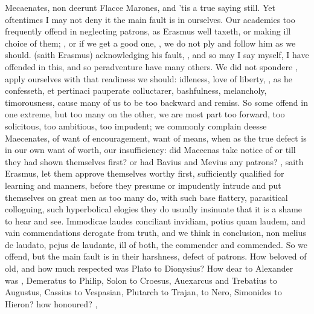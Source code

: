 {{{Mecaenates, non deerunt Flacce Marones}, and 'tis a true saying still.
Yet oftentimes I may not deny it the main fault is in ourselves. Our
academics too frequently offend in neglecting patrons, as Erasmus
well taxeth, or making ill choice of them; , or if we get a good one, , we do not ply and follow him as we should.
 (saith Erasmus) acknowledging his fault,
, and so may I say myself, I have offended
in this, and so peradventure have many others. We did not spondere
, apply ourselves with
that readiness we should: idleness, love of liberty, , as he confesseth, et
pertinaci pauperate colluctarer, bashfulness, melancholy, timorousness,
cause many of us to be too backward and remiss. So some offend in one
extreme, but too many on the other, we are most part too forward, too
solicitous, too ambitious, too impudent; we commonly complain deesse
Maecenates, of want of encouragement, want of means, when as the true
defect is in our own want of worth, our insufficiency: did Maecenas
take notice of \Horace{} or \Virgil{} till they had shown themselves first?
or had Bavius and Mevius any patrons? , saith
Erasmus, let them approve themselves worthy first, sufficiently
qualified for learning and manners, before they presume or impudently
intrude and put themselves on great men as too many do, with such base
flattery, parasitical colloguing, such hyperbolical elogies they do
usually insinuate that it is a shame to hear and see. Immodicae laudes
conciliant invidiam, potius quam laudem, and vain commendations
derogate from truth, and we think in conclusion, non melius de laudato,
pejus de laudante, ill of both, the commender and commended. So we
offend, but the main fault is in their harshness, defect of patrons.
How beloved of old, and how much respected was Plato to Dionysius? How
dear to Alexander was \Aristotle, Demeratus to Philip, Solon to Croesus,
Auexarcus and Trebatius to Augustus, Cassius to Vespasian, Plutarch to
Trajan, \Seneca to Nero, Simonides to Hieron? how honoured?
,

}}
